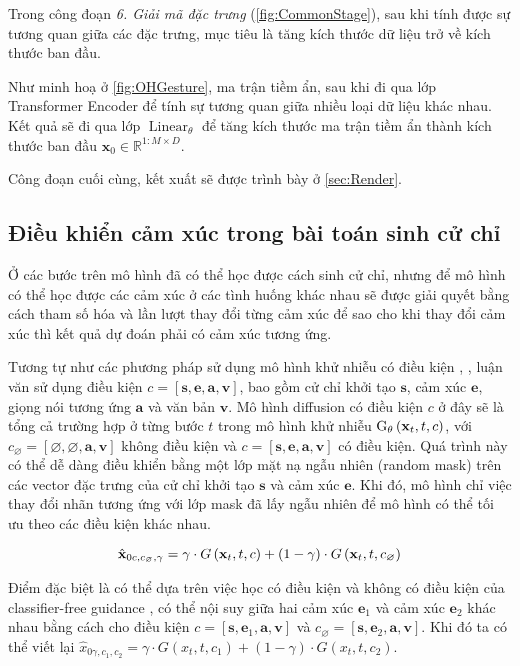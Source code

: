 Trong công đoạn \textit{6. Giải mã đặc trưng} (\autoref{fig:CommonStage}), sau khi tính được sự tương quan giữa các đặc trưng, mục tiêu là tăng kích thước dữ liệu trở về kích thước ban đầu.

Như minh hoạ ở \autoref{fig:OHGesture}, ma trận tiềm ẩn, sau khi đi qua lớp Transformer Encoder để tính sự tương quan giữa nhiều loại dữ liệu khác nhau. Kết quả sẽ đi qua lớp $\operatorname{Linear}_{\theta}$ để tăng kích thước ma trận tiềm ẩn thành kích thước ban  đầu $\hat{\mathbf{x}}_{0} \in \mathbb{R}^{1:M \times D}$.

Công đoạn cuối cùng, kết xuất sẽ được trình bày ở \autoref{sec:Render}.

\subsection{Điều khiển cảm xúc trong bài toán sinh cử chỉ}

Ở các bước trên mô hình đã có thể học được cách sinh cử chỉ, nhưng để mô hình có thể học được các cảm xúc ở các tình huống khác nhau sẽ được giải quyết bằng cách tham số hóa và lần lượt thay đổi từng cảm xúc để sao cho khi thay đổi cảm xúc thì kết quả dự đoán phải có cảm xúc tương ứng.

Tương tự như các phương pháp sử dụng mô hình khử nhiễu có điều kiện \cite{ho2022classifier}, \cite{tevet2022human}, luận văn sử dụng điều kiện $c = [ \mathbf{s}, \mathbf{e}, \mathbf{a}, \mathbf{v} ]$,  bao gồm cử chỉ khởi tạo $\mathbf{s}$, cảm xúc $\mathbf{e}$, giọng nói tương ứng $\mathbf{a}$ và văn bản $\mathbf{v}$. Mô hình diffusion có điều kiện $c$ ở đây sẽ là tổng cả trường hợp ở từng bước $t$ trong mô hình khử nhiễu $\text{G}_\theta \left( \mathbf{x}_{t}, t, c \right)$, với  $c_{\varnothing}=[\varnothing, \varnothing, \mathbf{a}, \mathbf{v}]$ không điều kiện và $c = [\mathbf{s}, \mathbf{e}, \mathbf{a}, \mathbf{v}]$ có điều kiện. Quá trình này có thể dễ dàng điều khiển bằng một lớp mặt nạ ngẫu nhiên (random mask) trên các vector đặc trưng của cử chỉ khởi tạo $\mathbf{s}$ và cảm xúc $\mathbf{e}$. Khi đó, mô hình chỉ việc thay đổi nhãn tương ứng với lớp mask đã lấy ngẫu nhiên để mô hình có thể tối ưu theo các điều kiện khác nhau. 


\begin{equation} \label{eq:denoise}
\hat{\mathbf{x}}_{0 c, c_{\varnothing}, \gamma}=\gamma \cdot G \left(\mathbf{x}_{t}, t, c\right)+(1-\gamma) \cdot G \left(\mathbf{x}_{t}, t, c_{\varnothing}\right)
\end{equation}

Điểm đặc biệt là có thể dựa trên việc học có điều kiện và không có điều kiện của classifier-free guidance \cite{ho2022classifier}, có thể nội suy giữa hai cảm xúc $\mathbf{e}_1$ và cảm xúc $\mathbf{e}_2$ khác nhau bằng cách cho điều kiện $c = \left[\mathbf{s}, \mathbf{e}_{1}, \mathbf{a}, \mathbf{v} \right]$ và $c_\varnothing = \left[\mathbf{s}, \mathbf{e}_{2}, \mathbf{a}, \mathbf{v} \right]$. Khi đó ta có thể viết lại $\hat{x}_{0 \gamma, c_{1}, c_{2}}=\gamma  \cdot G \left(x_{t}, t, c_{1} \right)+(1-\gamma) \cdot G \left(x_{t}, t, c_{2}\right)$.


